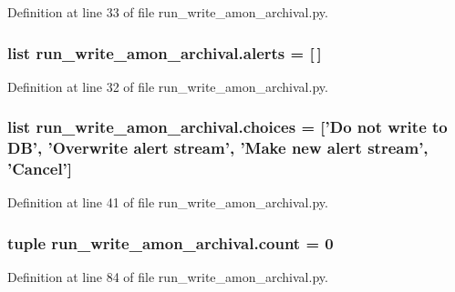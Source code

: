 Definition at line 33 of file run\-\_\-write\-\_\-amon\-\_\-archival.\-py.

\hypertarget{namespacerun__write__amon__archival_abd8b881689287fad598983ba07273f73}{
\subsubsection[{alerts}]{\setlength{\rightskip}{0pt plus 5cm}list run\-\_\-write\-\_\-amon\-\_\-archival.\-alerts = \mbox{[}$\,$\mbox{]}}}\label{namespacerun__write__amon__archival_abd8b881689287fad598983ba07273f73}


Definition at line 32 of file run\-\_\-write\-\_\-amon\-\_\-archival.\-py.

\hypertarget{namespacerun__write__amon__archival_aca6daf5feb21c980a644761c7a0496b4}{
\subsubsection[{choices}]{\setlength{\rightskip}{0pt plus 5cm}list run\-\_\-write\-\_\-amon\-\_\-archival.\-choices = \mbox{[}'Do not write to D\-B', 'Overwrite {\bf alert} {\bf stream}', 'Make new {\bf alert} {\bf stream}', 'Cancel'\mbox{]}}}\label{namespacerun__write__amon__archival_aca6daf5feb21c980a644761c7a0496b4}


Definition at line 41 of file run\-\_\-write\-\_\-amon\-\_\-archival.\-py.

\hypertarget{namespacerun__write__amon__archival_a89f481b3ff8baa3b71ca31b44b67ec47}{
\subsubsection[{count}]{\setlength{\rightskip}{0pt plus 5cm}tuple run\-\_\-write\-\_\-amon\-\_\-archival.\-count = 0}}\label{namespacerun__write__amon__archival_a89f481b3ff8baa3b71ca31b44b67ec47}


Definition at line 84 of file run\-\_\-write\-\_\-amon\-\_\-archival.\-py.

